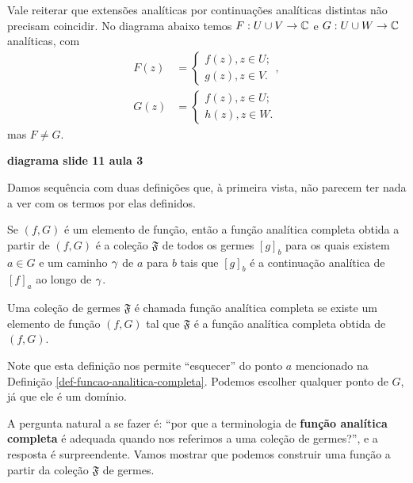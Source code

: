 \begin{observacao}
        Vale reiterar que extensões analíticas por continuações analíticas distintas
        não precisam coincidir. No diagrama abaixo temos $F: U\cup V\to\mathbb{C}$
        e $G:U\cup W\to\mathbb{C}$ analíticas, com
        \begin{align*}
            F(z) &= 
            \begin{cases}
                f(z), z\in U; \\
                g(z), z\in V.
            \end{cases}, \\
            G(z) &= 
            \begin{cases}
                f(z), z\in U; \\
                h(z), z\in W.
            \end{cases}
        \end{align*}
        mas $F\neq G$.
        \begin{center}
            \textbf{diagrama slide 11 aula 3}
        \end{center}
    \end{observacao}

    Damos sequência com duas definições que, à primeira vista, não parecem ter 
    nada a ver com os termos por elas definidos.

    \begin{definicao}
    \label{def-funcao-analitica-completa}
        Se $(f,G)$ é um elemento de função, então a função analítica completa obtida
        a partir de $(f,G)$ é a coleção $\mathfrak{F}$ de todos os germes $[g]_b$ 
        para os quais existem $a\in G$ e um caminho $\gamma$ de $a$ para $b$ 
        tais que $[g]_b$ é a continuação analítica de $[f]_a$ ao longo de $\gamma$.
    \end{definicao}


    \begin{definicao}
        Uma coleção de germes $\mathfrak{F}$ é chamada função analítica completa se
        existe um elemento de função $(f,G)$ tal que $\mathfrak{F}$ é a função analítica
        completa obtida de $(f,G)$.
    \end{definicao}

    Note que esta definição nos permite ``esquecer'' do ponto $a$ mencionado na
    Definição \ref{def-funcao-analitica-completa}. Podemos escolher qualquer ponto
    de $G$, já que ele é um domínio.

    A pergunta natural a se fazer é: ``por que a terminologia de 
    \textbf{função analítica completa} é adequada quando nos referimos a uma
    coleção de germes?'', e a resposta é surpreendente. Vamos mostrar que
    podemos construir uma função a partir da coleção $\mathfrak{F}$ de germes.

